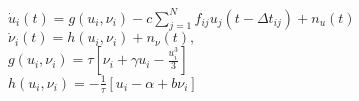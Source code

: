 \documentclass[12pt]{article}
\begin{document}
  
    $\dot{u}_i(t) = g(u_i,\nu_i) - c\sum_{j=1}^{N}f_{ij}u_j(t-\Delta t_{ij}) + n_u(t)$
    \\
    $\dot{\nu}_i(t) = h(u_i,\nu_i) + n_{\nu}(t),$
    \\
    $g(u_i,\nu_i) = \tau[\nu_i + \gamma u_i - \frac{u_i^3}{3}]$
    \\
    $h(u_i,\nu_i) = -\frac{1}{\tau}[u_i - \alpha +b \nu_i]$

  
\end{document}
